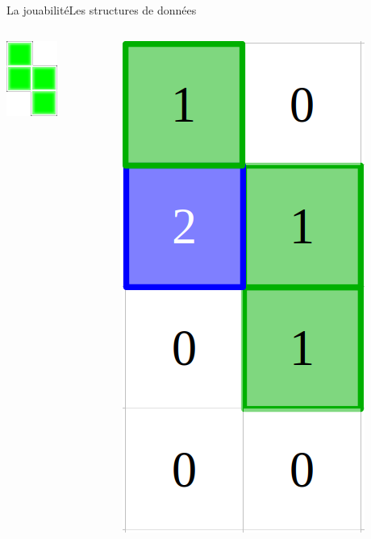 \documentclass[french]{beamer}
\begin{document}
\begin{frame}{La jouabilité}{Les structures de données}
				\begin{columns}
					\begin{column}{0.1\textwidth}
						\begin{center}
							\includegraphics[scale=0.5]{img/2.png}
						\end{center}
					\end{column}
					\begin{column}{0.1\textwidth}
						\begin{center}
							\includegraphics[scale=0.1]{img/tetro.png}
						\end{center}
					\end{column}
				\end{columns}
				
			\end{frame}
\end{document}
